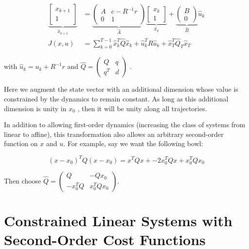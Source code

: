 \documentclass[letterpaper, 10pt, english, conference]{IEEEtran}
\begin{document}
\begin{align*}
\underbrace{\left[\begin{matrix}x_{k+1}\\
1
\end{matrix}\right]}_{\hat{x}_{k+1}} & =\underbrace{\left(\begin{matrix}A & c-R^{-1}r\\
0 & 1
\end{matrix}\right)}_{\hat{A}}\underbrace{\left[\begin{matrix}x_{k}\\
1
\end{matrix}\right]}_{\hat{x}_{k}}+\underbrace{\left(\begin{matrix}B\\
0
\end{matrix}\right)}_{\hat{B}}\hat{u}_{k}\\
J\left(x,u\right) & =\sum_{k=0}^{T-1}\hat{x}_{k}^{T}\hat{Q}\hat{x}_{k}+\hat{u}_{k}^{T}R\hat{u}_{k}+\hat{x}_{T}^{T}\hat{Q}_{T}\hat{x}_{T}
\end{align*}


with $\hat{u}_{k}=u_{k}+R^{-1}r$ and $\hat{Q}=\left(\begin{matrix}Q & q\\
q^{T} & d
\end{matrix}\right)$ . 

Here we augment the state vector with an additional dimension whose
value is constrained by the dynamics to remain constant. As long as
this additional dimension is unity in $x_{0}$ , then it will be unity
along all trajectories.

In addition to allowing first-order dynamics (increasing the class
of systems from linear to affine), this transformation also allows
an arbitrary second-order function on $x$ and $u$. For example,
say we want the following bowl:

\[
\left(x-x_{0}\right)^{T}Q\left(x-x_{0}\right)=x^{T}Qx+-2x_{0}^{T}Qx+x_{0}^{T}Qx_{0}
\]


Then choose $\hat{Q}=\left(\begin{array}{cc}
Q & -Qx_{0}\\
-x_{0}^{T}Q & x_{0}^{T}Qx_{0}
\end{array}\right)$.


\section{Constrained Linear Systems with Second-Order Cost Functions}
\end{document}
